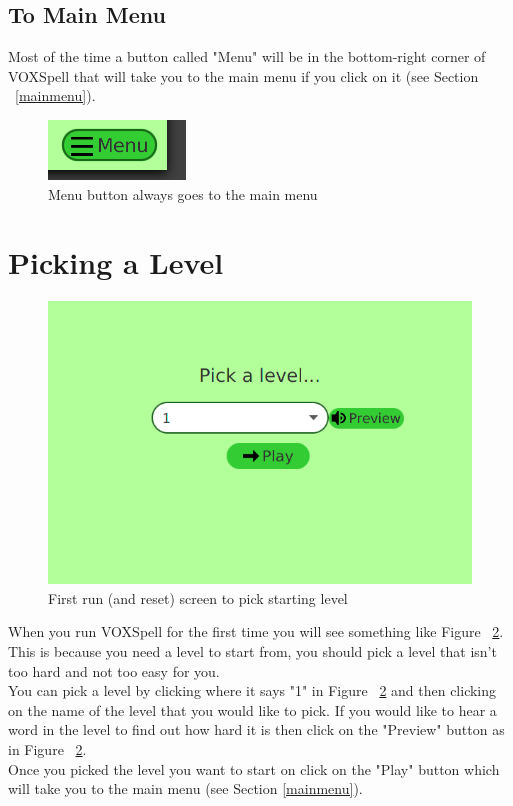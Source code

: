 \documentclass[12pt,a4paper,titlepage,onecolumn]{article}
\begin{document}
		\subsection{To Main Menu}
		Most of the time a button called "Menu" will be in the bottom-right corner of VOXSpell that will take you to the main menu if you click on it (see Section ~\ref{mainmenu}).
		\begin{figure}[h]
		\centering
		\includegraphics[width=0.2\linewidth]{Figures/Introduction/Menu}
		\caption[Menu Button]{Menu button always goes to the main menu}
		\label{fig:Menu}
		\end{figure}


	
	\section{Picking a Level}\label{picklevel}
	\begin{figure}[h]
	\centering
	\includegraphics[width=1\linewidth]{"Figures/Picking a Level/PickLevelGeneral"}
	\caption[PickLevel]{First run (and reset) screen to pick starting level}
	\label{fig:PickLevelGeneral}
	\end{figure}

	When you run VOXSpell for the first time you will see something like Figure ~\ref{fig:PickLevelGeneral}. This is because you need a level to start from, you should pick a level that isn't too hard and not too easy for you. \\
	You can pick a level by clicking where it says "1" in Figure ~\ref{fig:PickLevelGeneral} and then clicking on the name of the level that you would like to pick. If you would like to hear a word in the level to find out how hard it is then click on the "Preview" button as in Figure ~\ref{fig:PickLevelGeneral}.\\
	Once you picked the level you want to start on click on the "Play" button which will take you to the main menu (see Section \ref{mainmenu}).
	
\end{document}
